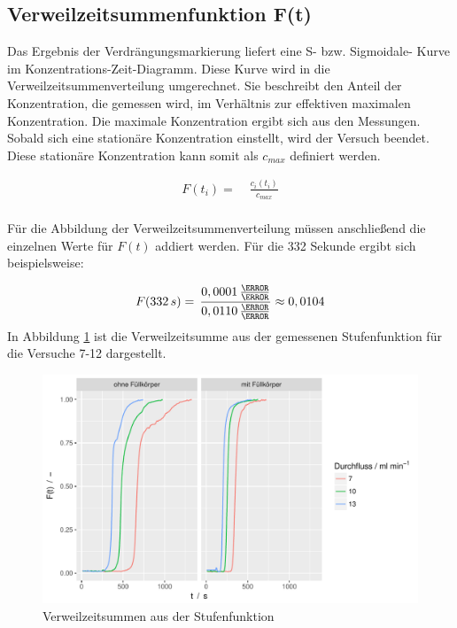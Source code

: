 \documentclass[12pt,liststotoc]{report}
\begin{document}
\subsection{Verweilzeitsummenfunktion F(t)}

Das Ergebnis der Verdrängungsmarkierung liefert eine S- bzw. Sigmoidale- Kurve im Konzentrations-Zeit-Diagramm. Diese Kurve wird in die Verweilzeitsummenverteilung umgerechnet. Sie beschreibt den Anteil der Konzentration, die gemessen wird, im Verhältnis zur effektiven maximalen Konzentration. Die maximale Konzentration ergibt sich aus den Messungen. Sobald sich eine stationäre Konzentration einstellt, wird der Versuch beendet. Diese stationäre Konzentration kann somit als $c_{max}$ definiert werden. 

\begin{align}
F(t_i)=&\;\frac{c_i(t_i)}{c_{max}}\\
\end{align}

Für die Abbildung der Verweilzeitsummenverteilung müssen anschließend die einzelnen Werte für $F(t)$ addiert werden. Für die 332 Sekunde ergibt sich beispielsweise:

\begin{equation}
F(332\,s)=\,\frac{ 0,0001\,\frac{\mole}{\litre}}{0,0110\,\frac{\mole}{\litre}} \approx 0,0104 \notag
\end{equation}
\noindent
In Abbildung \ref{summe_step} ist die Verweilzeitsumme aus der gemessenen Stufenfunktion für die Versuche 7-12 dargestellt.

\begin{figure}[H]
\centering
\includegraphics[width=1\textwidth]{Graphics/F_step.pdf}
\caption[Verweilzeitsumme Sprungfunktion]{Verweilzeitsummen aus der Stufenfunktion}
\label{summe_step}
\end{figure}
\noindent
\end{document}
